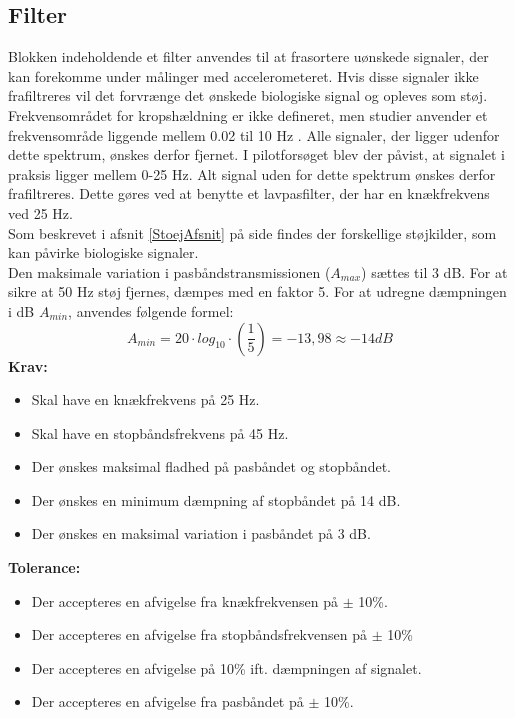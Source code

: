 \subsection{Filter}\label{FilterAfs}
Blokken indeholdende et filter anvendes til at frasortere uønskede signaler, der kan forekomme under målinger med accelerometeret. Hvis disse signaler ikke frafiltreres vil det forvrænge det ønskede biologiske signal og opleves som støj. Frekvensområdet for kropshældning er ikke defineret, men studier anvender et frekvensområde liggende mellem 0.02 til 10 Hz \cite{Martinez-Mendez2011}. Alle signaler, der ligger udenfor dette spektrum, ønskes derfor fjernet. I pilotforsøget blev der påvist, at signalet i praksis ligger mellem 0-25 Hz. Alt signal uden for dette spektrum ønskes derfor frafiltreres. Dette gøres ved at benytte et lavpasfilter, der har en knækfrekvens ved 25 Hz. \\
Som beskrevet i afsnit \ref{StoejAfsnit} på side \pageref{StoejAfsnit} findes der forskellige støjkilder, som kan påvirke biologiske signaler. \\
Den maksimale variation i pasbåndstransmissionen ($A_{max}$) sættes til 3 dB. For at sikre at 50 Hz støj fjernes, dæmpes med en faktor 5. For at udregne dæmpningen i dB $A_{min}$, anvendes følgende formel:
\begin{equation}
A_{min}=20 \cdot log_{10} \cdot (\frac{1}{5}) = -13,98 \approx -14 dB
\end{equation}
\textbf{Krav:}
\begin{itemize}
	\item Skal have en knækfrekvens på 25 Hz.
	\item Skal have en stopbåndsfrekvens på 45 Hz.
	\item Der ønskes maksimal fladhed på pasbåndet og stopbåndet.
	\item Der ønskes en minimum dæmpning af stopbåndet på 14 dB. 
	\item Der ønskes en maksimal variation i pasbåndet på 3 dB. 
\end{itemize}
\textbf{Tolerance:}
\begin{itemize}
	\item Der accepteres en afvigelse fra knækfrekvensen på $\pm$ 10\%.
	\item Der accepteres en afvigelse fra stopbåndsfrekvensen på $\pm$ 10\%
	\item Der accepteres en afvigelse på 10\% ift. dæmpningen af signalet.
	\item Der accepteres en afvigelse fra pasbåndet på $\pm$ 10\%.
\end{itemize}
